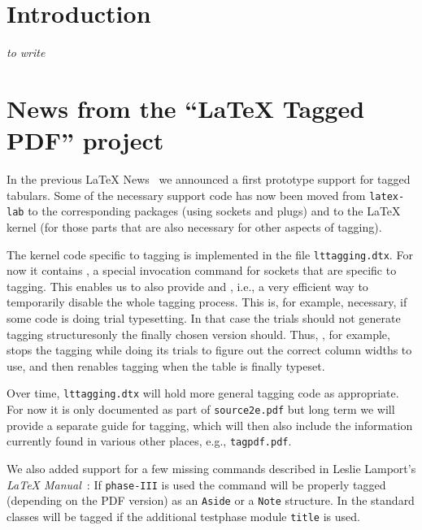 \documentclass{ltnews}
\providecommand\Dash {\unskip \textemdash}
\providecommand\tubcommand[1]{}
\begin{document}
\tubcommand{\addtolength\textheight{4.2pc}}   %

\maketitle
{  \spaceskip=3.33pt 
\tableofcontents}

\setlength{}

\medskip

\section{Introduction}

\emph{to write}


\section{News from the \enquote{\LaTeX{} Tagged PDF} project}

In the previous \LaTeX{} News~\cite{39:ltnews38} we announced a first prototype
support for tagged tabulars. Some of the necessary support code has
now been moved from \texttt{latex-lab} to the corresponding packages
(using sockets and plugs) and to the \LaTeX{} kernel (for those parts
that are also necessary for other aspects of tagging).

The kernel code specific to tagging is implemented in the file
\texttt{lttagging.dtx}.  For now it contains , a
special invocation command for sockets that are specific to
tagging. This enables us to also provide  and
, i.e., a very efficient way to temporarily disable
the whole tagging process. This is, for example, necessary, if some
code is doing trial typesetting. In that case the trials should not
generate tagging structures\Dash only the finally chosen version
should. Thus, , for example, stops the tagging while
doing its trials to figure out the correct column widths to use, and
then renables tagging when the table is finally typeset.

Over time, \texttt{lttagging.dtx} will hold more general tagging code
as appropriate. For now it is only documented as part of
\texttt{source2e.pdf} but long term we will provide a separate guide
for tagging, which will then also include the information currently
found in various other places, e.g., \texttt{tagpdf.pdf}.

We also added support for a few missing commands 
described in Leslie Lamport's \emph{\LaTeX{}
Manual}~\cite{38:Lamport}: If \texttt{phase-III} is used 
the  command will be properly tagged (depending on
the PDF version) as an \texttt{Aside} or a \texttt{Note} structure.
In the standard classes  will be tagged if the additional
testphase module \texttt{title} is used.
\end{document}
